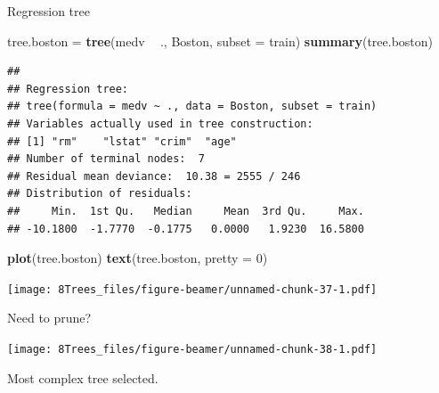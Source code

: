 \documentclass[10pt,ignorenonframetext,]{beamer}
\newenvironment{Shaded}{\begin{snugshade}}{\end{snugshade}}
\newcommand{\KeywordTok}[1]{\textcolor[rgb]{0.13,0.29,0.53}{\textbf{#1}}}
\newcommand{\DataTypeTok}[1]{\textcolor[rgb]{0.13,0.29,0.53}{#1}}
\newcommand{\DecValTok}[1]{\textcolor[rgb]{0.00,0.00,0.81}{#1}}
\newcommand{\StringTok}[1]{\textcolor[rgb]{0.31,0.60,0.02}{#1}}
\newcommand{\OperatorTok}[1]{\textcolor[rgb]{0.81,0.36,0.00}{\textbf{#1}}}
\newcommand{\NormalTok}[1]{#1}
\begin{document}
\begin{frame}[fragile]

\begin{block}{Regression tree}

\begin{Shaded}
\begin{Highlighting}[]
\NormalTok{tree.boston =}\StringTok{ }\KeywordTok{tree}\NormalTok{(medv }\OperatorTok{~}\StringTok{ }\NormalTok{., Boston, }\DataTypeTok{subset =}\NormalTok{ train)}
\KeywordTok{summary}\NormalTok{(tree.boston)}
\end{Highlighting}
\end{Shaded}

\begin{verbatim}
## 
## Regression tree:
## tree(formula = medv ~ ., data = Boston, subset = train)
## Variables actually used in tree construction:
## [1] "rm"    "lstat" "crim"  "age"  
## Number of terminal nodes:  7 
## Residual mean deviance:  10.38 = 2555 / 246 
## Distribution of residuals:
##     Min.  1st Qu.   Median     Mean  3rd Qu.     Max. 
## -10.1800  -1.7770  -0.1775   0.0000   1.9230  16.5800
\end{verbatim}

\begin{Shaded}
\begin{Highlighting}[]
\KeywordTok{plot}\NormalTok{(tree.boston)}
\KeywordTok{text}\NormalTok{(tree.boston, }\DataTypeTok{pretty =} \DecValTok{0}\NormalTok{)}
\end{Highlighting}
\end{Shaded}

\texttt{[image: 8Trees\_files/figure-beamer/unnamed-chunk-37-1.pdf]}

\end{block}

\end{frame}

\begin{frame}[fragile]

\begin{block}{Need to prune?}

\begin{Shaded}
\end{Shaded}

\texttt{[image: 8Trees\_files/figure-beamer/unnamed-chunk-38-1.pdf]}

Most complex tree selected.

\end{block}

\end{frame}
\end{document}
